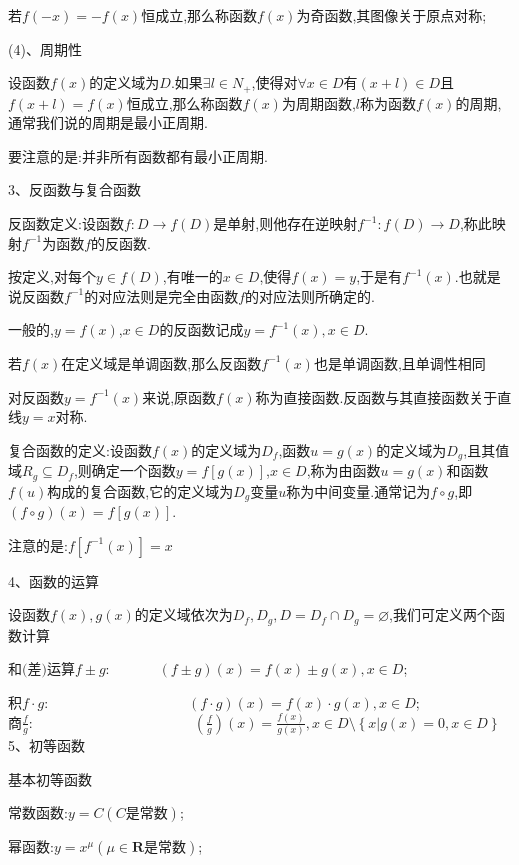 \documentclass[UTF8]{ctexart}
\begin{document}
若$f(-x)=-f(x)$恒成立,那么称函数$f(x)$为奇函数,其图像关于原点对称;

(4)、周期性

设函数$f(x)$的定义域为$D$.如果$\exists l\in N_{+}$,使得对$\forall x\in D$有$(x+l)\in D$且$f(x+l)=f(x)$恒成立,那么称函数$f(x)$为周期函数,$l$称为函数$f(x)$的周期,通常我们说的周期是最小正周期.

要注意的是:并非所有函数都有最小正周期.

3、反函数与复合函数

反函数定义:设函数$f:D\to f(D)$是单射,则他存在逆映射$f^{-1}:f(D)\to D$,称此映射$f^{-1}$为函数$f$的反函数.

按定义,对每个$y\in f(D)$,有唯一的$x\in D$,使得$f(x)=y$,于是有$f^{-1}(x)$.也就是说反函数$f^{-1}$的对应法则是完全由函数$f$的对应法则所确定的.

一般的,$y=f(x)$,$x\in D$的反函数记成$y=f^{-1}(x),x\in D$.

若$f(x)$在定义域是单调函数,那么反函数$f^{-1}(x)$也是单调函数,且单调性相同

对反函数$y=f^{-1}(x)$来说,原函数$f(x)$称为直接函数.反函数与其直接函数关于直线$y=x$对称.

复合函数的定义:设函数$f(x)$的定义域为$D_{f}$,函数$u=g(x)$的定义域为$D_{g}$,且其值域$R_g\subseteq D_{f}$,则确定一个函数$y=f\left[g(x)\right]$,$x\in D$,称为由函数$u=g(x)$和函数$f(u)$构成的复合函数,它的定义域为$D_{g}$变量$u$称为中间变量.通常记为$f\circ g$,即$(f\circ g)(x)=f\left[g(x)\right]$.

注意的是:$f\left[f^{-1}(x)\right]=x$

4、函数的运算

设函数$f(x),g(x)$的定义域依次为$D_{f},D_{g},D=D_{f}\cap D_{g}=\varnothing $,我们可定义两个函数计算

和$($差$)$运算$f\pm g$:\ \ \ \ \ \ \ $(f\pm g)(x)=f(x)\pm g(x),x\in D$;

积$f\cdot g$:\ \ \ \ \ \ \ \ \ \ \ \ \ \ \ \ \ \ \ \ $(f\cdot g)(x)=f(x)\cdot g(x),x\in D$;\\

商$\displaystyle \frac{f}{g}$:\ \ \ \ \ \ \ \ \ \ \ \ \ \ \ \ \ \ \ \ \ \ \ $\displaystyle (\frac{f}{g})(x)=\frac{f(x)}{g(x)},x\in D\setminus \left\{x|g(x)=0,x\in D\right\} $\\

5、初等函数

基本初等函数

常数函数:$y=C(C\text{是常数})$;

幂函数:$y=x^{\mu }(\mu \in \mathbf{R} \text{是常数})$;
\end{document}
